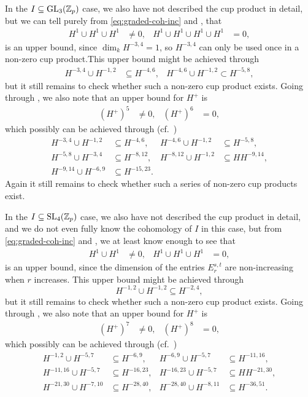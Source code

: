 In the $I \subseteq \operatorname{GL}_{3}(\mathbb{Z}_{p})$ case, we also have not described the cup product in detail, but we can tell purely from \eqref{eq:graded-coh-inc} and , that
\begin{align*}
  H^{1} \cup H^{1} \cup H^{1} &\neq 0, & H^{1} \cup H^{1} \cup H^{1} \cup H^{1} &= 0,
\end{align*}
is an upper bound, since $\dim_{k} H^{-3,4} = 1$, so $H^{-3,4}$ can only be used once in a non-zero cup product.This upper bound might be achieved through
\begin{align*}
  H^{-3,4} \cup H^{-1,2} &\subseteq H^{-4,6}, & H^{-4,6} \cup H^{-1,2} \subset H^{-5,8},
\end{align*}
but it still remains to check whether such a non-zero cup product exists. Going through , we also note that an upper bound for $H^{+}$ is
\begin{align*}
  (H^{+})^{5} &\neq 0, & (H^{+})^{6} &= 0,
\end{align*}
which possibly can be achieved through (cf.\ \cite{code})
\begin{align*}
  H^{-3,4} \cup H^{-1,2} &\subseteq H^{-4,6}, & H^{-4,6} \cup H^{-1,2} &\subseteq H^{-5,8}, \\
  H^{-5,8} \cup H^{-3,4} &\subseteq H^{-8,12}, & H^{-8,12} \cup H^{-1,2} &\subseteq HH^{-9,14}, \\
  H^{-9,14} \cup H^{-6,9} &\subseteq H^{-15,23}.
\end{align*}
Again it still remains to check whether such a series of non-zero cup products exist.

In the $I \subseteq \operatorname{SL}_{4}(\mathbb{Z}_{p})$ case, we also have not described the cup product in detail, and we do not even fully know the cohomology of $I$ in this case, but from \eqref{eq:graded-coh-inc} and , we at least know enough to see that
\begin{align*}
  H^{1} \cup H^{1} &\neq 0, & H^{1} \cup H^{1} \cup H^{1} &= 0,
\end{align*}
is an upper bound, since the dimension of the entries $E_{r}^{s,t}$ are non-increasing when $r$ increases. This upper bound might be achieved through
\begin{equation*}
  H^{-1,2} \cup H^{-1,2} \subseteq H^{-2,4},
\end{equation*}
but it still remains to check whether such a non-zero cup product exists. Going through , we also note that an upper bound for $H^{+}$ is
\begin{align*}
  (H^{+})^{7} &\neq 0, & (H^{+})^{8} &= 0,
\end{align*}
which possibly can be achieved through (cf.\ \cite{code})
\begin{align*}
  H^{-1,2} \cup H^{-5,7} &\subseteq H^{-6,9}, & H^{-6,9} \cup H^{-5,7} &\subseteq H^{-11,16}, \\
  H^{-11,16} \cup H^{-5,7} &\subseteq H^{-16,23}, & H^{-16,23} \cup H^{-5,7} &\subseteq HH^{-21,30}, \\
  H^{-21,30} \cup H^{-7,10} &\subseteq H^{-28,40}, & H^{-28,40} \cup H^{-8,11} &\subseteq H^{-36,51}.
\end{align*}

